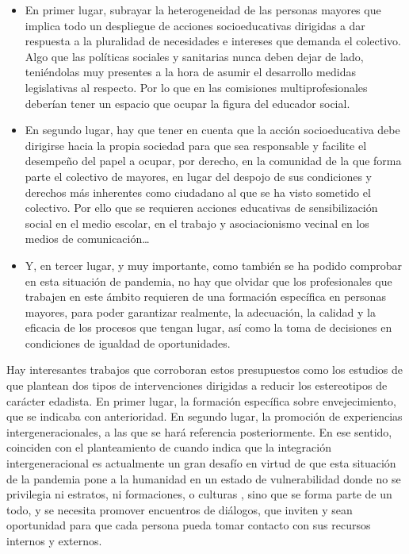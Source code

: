 \documentclass[spanish]{textolivre}
\begin{document}
\begin{itemize}
    \item En primer lugar, subrayar la heterogeneidad de las personas mayores que implica todo un despliegue de acciones socioeducativas dirigidas a dar respuesta a la pluralidad de necesidades e intereses que demanda el colectivo. Algo que las políticas sociales y sanitarias nunca deben dejar de lado, teniéndolas muy presentes a la hora de asumir el desarrollo medidas legislativas al respecto. Por lo que en las comisiones multiprofesionales deberían tener un espacio que ocupar la figura del educador social.
    \item En segundo lugar, hay que tener en cuenta que la acción socioeducativa debe dirigirse hacia la propia sociedad para que sea responsable y facilite el desempeño del papel a ocupar, por derecho, en la comunidad de la que forma parte el colectivo de mayores, en lugar del despojo de sus condiciones y derechos más inherentes como ciudadano al que se ha visto sometido el colectivo. Por ello que se requieren acciones educativas de sensibilización social en el medio escolar, en el trabajo y asociacionismo vecinal en los medios de comunicación…
    \item Y, en tercer lugar, y muy importante, como también se ha podido comprobar en esta situación de pandemia, no hay que olvidar que los profesionales que trabajen en este ámbito requieren de una formación específica en personas mayores, para poder garantizar realmente, la adecuación, la calidad y la eficacia de los procesos que tengan lugar, así como la toma de decisiones en condiciones de igualdad de oportunidades.
\end{itemize}

Hay interesantes trabajos que corroboran estos presupuestos como los estudios de \textcite{lorentem2020} %
que plantean dos tipos de intervenciones dirigidas a reducir los estereotipos de carácter edadista. En primer lugar, la formación específica sobre envejecimiento, que se indicaba con anterioridad. En segundo lugar, la promoción de experiencias intergeneracionales, a las que se hará referencia posteriormente. En ese sentido, coinciden con el planteamiento de \textcite{lopezdoblas2020} %
cuando indica que la integración intergeneracional es actualmente un gran desafío en virtud de que esta situación de la pandemia pone a la humanidad en un estado de vulnerabilidad donde no se privilegia ni estratos, ni formaciones, o culturas \cite{moral2017}, %
sino que se forma parte de un todo, y se necesita promover encuentros de diálogos, que inviten y sean oportunidad para que cada persona pueda tomar contacto con sus recursos internos y externos.
\end{document}
